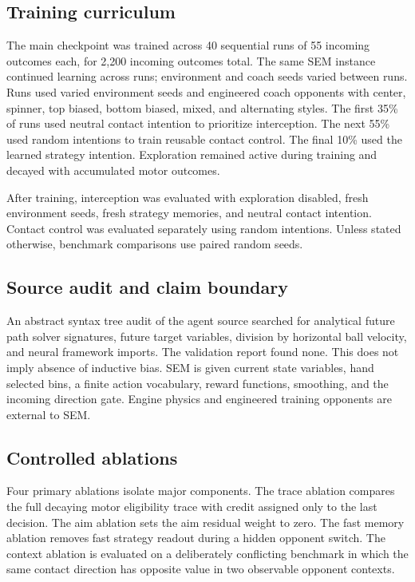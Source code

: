 \documentclass[10pt,twocolumn]{article}
\begin{document}
\subsection{Training curriculum}
The main checkpoint was trained across 40 sequential runs of 55 incoming outcomes each, for 2,200 incoming outcomes total. The same SEM instance continued learning across runs; environment and coach seeds varied between runs. Runs used varied environment seeds and engineered coach opponents with center, spinner, top biased, bottom biased, mixed, and alternating styles. The first 35\% of runs used neutral contact intention to prioritize interception. The next 55\% used random intentions to train reusable contact control. The final 10\% used the learned strategy intention. Exploration remained active during training and decayed with accumulated motor outcomes.

After training, interception was evaluated with exploration disabled, fresh environment seeds, fresh strategy memories, and neutral contact intention. Contact control was evaluated separately using random intentions. Unless stated otherwise, benchmark comparisons use paired random seeds.

\subsection{Source audit and claim boundary}
An abstract syntax tree audit of the agent source searched for analytical future path solver signatures, future target variables, division by horizontal ball velocity, and neural framework imports. The validation report found none. This does not imply absence of inductive bias. SEM is given current state variables, hand selected bins, a finite action vocabulary, reward functions, smoothing, and the incoming direction gate. Engine physics and engineered training opponents are external to SEM.

\subsection{Controlled ablations}
Four primary ablations isolate major components. The trace ablation compares the full decaying motor eligibility trace with credit assigned only to the last decision. The aim ablation sets the aim residual weight to zero. The fast memory ablation removes fast strategy readout during a hidden opponent switch. The context ablation is evaluated on a deliberately conflicting benchmark in which the same contact direction has opposite value in two observable opponent contexts.
\end{document}
